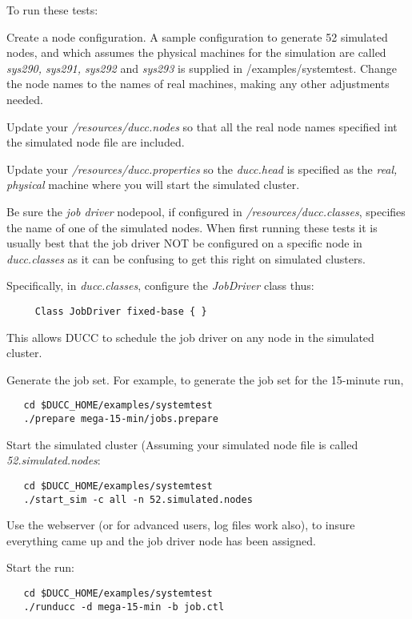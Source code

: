      To run these tests:
     \begin{enumerate}

       \begin{sloppypar}
       \item Create a node configuration.  A sample configuration to generate
         52 simulated nodes, and which assumes the
         physical machines for the simulation are called {\em sys290, sys291, sys292}
         and {\em sys293} is supplied in \duccruntime/examples/systemtest. Change
         the node names to the names of real machines, making any other adjustments
         needed.
       \end{sloppypar}
       
       \item Update your {\em \duccruntime/resources/ducc.nodes} so that all the real node names specified
         int the simulated node file are included.
       \item Update your {\em \duccruntime/resources/ducc.properties} so the 
         {\em ducc.head} is specified as the {\em real, physical} machine where you will
         start the simulated cluster.
       \item Be sure the {\em job driver} nodepool, if configured in
         {\em \duccruntime/resources/ducc.classes}, specifies the name of one of the
         simulated nodes.  When first running these tests it is usually best that
         the job driver NOT be configured on a specific node in {\em ducc.classes}
         as it can be confusing to get this right on simulated clusters.

         Specifically, in {\em ducc.classes}, configure the {\em JobDriver} class
         thus:
\begin{verbatim}
     Class JobDriver fixed-base { }
\end{verbatim}
         This allows DUCC to schedule the job driver on any node in the simulated
         cluster.
        
       \item Generate the job set.  For example, to generate the job set for the
         15-minute run,
\begin{verbatim}
   cd $DUCC_HOME/examples/systemtest
   ./prepare mega-15-min/jobs.prepare
\end{verbatim}
         \item Start the simulated cluster (Assuming your simulated node file is called
           {\em 52.simulated.nodes}:
\begin{verbatim}
   cd $DUCC_HOME/examples/systemtest
   ./start_sim -c all -n 52.simulated.nodes
\end{verbatim}
         \item Use the webserver (or for advanced users, log files work also), to insure
           everything came up and the job driver node has been assigned.
         \item Start the run:
\begin{verbatim}
   cd $DUCC_HOME/examples/systemtest
   ./runducc -d mega-15-min -b job.ctl
\end{verbatim}             
         \end{enumerate}
     
